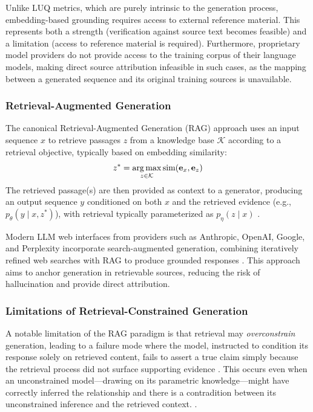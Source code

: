 Unlike LUQ metrics, which are purely intrinsic to the generation process, embedding-based grounding requires access to external reference material. This represents both a strength (verification against source text becomes feasible) and a limitation (access to reference material is required). Furthermore, proprietary model providers do not provide access to the training corpus of their language models, making direct source attribution infeasible in such cases, as the mapping between a generated sequence and its original training sources is unavailable.

\subsubsection{Retrieval-Augmented Generation}

The canonical Retrieval-Augmented Generation (RAG) approach \citep{lewis2020retrieval} uses an input sequence $x$ to retrieve passages $z$ from a knowledge base $\mathcal{K}$ according to a retrieval objective, typically based on embedding similarity:
\begin{equation}
z^* = \operatorname*{arg\,max}_{z \in \mathcal{K}} \text{sim}(\mathbf{e}_x, \mathbf{e}_z)
\end{equation}
The retrieved passage(s) are then provided as context to a generator, producing an output sequence $y$ conditioned on both $x$ and the retrieved evidence (e.g., $p_\theta(y \mid x, z^*)$), with retrieval typically parameterized as $p_\eta(z \mid x)$ \citep{lewis2020retrieval}.

Modern LLM web interfaces from providers such as Anthropic, OpenAI, Google, and Perplexity incorporate search-augmented generation, combining iteratively refined web searches with RAG to produce grounded responses \citep{wu2025clashevalquantifyingtugofwarllms}. This approach aims to anchor generation in retrievable sources, reducing the risk of hallucination and provide direct attribution.

\subsubsection{Limitations of Retrieval-Constrained Generation}

A notable limitation of the RAG paradigm is that retrieval may \textit{overconstrain} generation, leading to a failure mode where the model, instructed to condition its response solely on retrieved content, fails to assert a true claim simply because the retrieval process did not surface supporting evidence \citep{liu2023lostmiddle}. This occurs even when an unconstrained model---drawing on its parametric knowledge---might have correctly inferred the relationship and there is a contradition between its unconstrained inference and the retrieved context. \citep{wu2025clashevalquantifyingtugofwarllms}.

